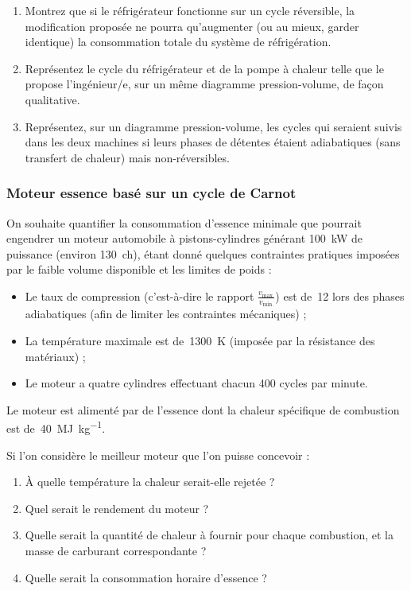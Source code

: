 		\begin{enumerate}
			\item Montrez que si le réfrigérateur fonctionne sur un cycle réversible, la modification proposée ne pourra qu’augmenter (ou au mieux, garder identique) la consommation totale du système de réfrigération.
			\item Représentez le cycle du réfrigérateur et de la pompe à chaleur telle que le propose l’ingénieur/e, sur un même diagramme pression-volume, de façon qualitative.
			\item Représentez, sur un diagramme pression-volume, les cycles qui seraient suivis dans les deux machines si leurs phases de détentes étaient adiabatiques (sans transfert de chaleur) mais non-réversibles.
		\end{enumerate}


\subsubsection{Moteur essence basé sur un cycle de Carnot}
\label{exo_carnot_quatre_cylindres}

	On souhaite quantifier la consommation d’essence minimale que pourrait engendrer un moteur automobile à pistons-cylindres générant \SI{100}{\kilo\watt} de puissance (environ \SI{130}{ch}), étant donné quelques contraintes pratiques imposées par le faible volume disponible et les limites de poids :
		
	\begin{itemize}
		\item Le taux de compression (c’est-à-dire le rapport $\frac{v_\text{max.}}{v_\text{min.}}$) est de~\num{12} lors des phases adiabatiques (afin de limiter les contraintes mécaniques) ;
		\item La température maximale est de~\SI{1300}{\kelvin} (imposée par la résistance des matériaux) ;
		\item Le moteur a quatre cylindres effectuant chacun \num{400} cycles par minute.
	\end{itemize}
	
	Le moteur est alimenté par de l’essence dont la chaleur spécifique de combustion est de~\SI{40}{\mega\joule\per\kilogram}.
	
	Si l’on considère le meilleur moteur que l’on puisse concevoir :
	
	\begin{enumerate}
		\item À quelle température la chaleur serait-elle rejetée ?
		\item Quel serait le rendement du moteur ?
		\item Quelle serait la quantité de chaleur à fournir pour chaque combustion, et la masse de carburant correspondante ?
		\item Quelle serait la consommation horaire d’essence ?
	\end{enumerate}

